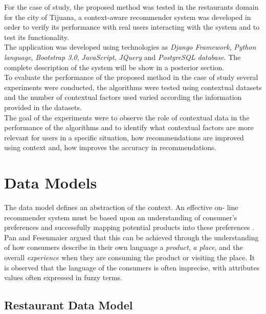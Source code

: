 For the case of study, the proposed method was tested in the 
restaurants domain for the city of Tijuana, a context-aware 
recommender system  was developed  in order to verify its 
performance with real users interacting with  the system and to
test  its functionality. \\  The application was developed using
technologies as \textit{Django Framework}, \textit{Python language}, 
\textit{Bootstrap 3.0}, \textit{JavaScript}, \textit{JQuery} and  
\textit{PostgreSQL database}. The complete description of the 
system will be show in a posterior section.\\ 
To evaluate the performance of the proposed method in
the case of study several experiments were conducted, the algorithms
were tested using  contextual datasets and the number of contextual
factors used varied  according the information provided in the
datasets. \\ The goal of the  experiments were to observe the role of
contextual data  in the performance of the algorithms and to
identify what contextual factors are more relevant for users in a
specific situation, how recommendations are improved using context
and, how improves the accuracy in recommendations.

\section{Data Models}

The data model defines an abstraction of the context. An effective on-
line  recommender system must be based upon an understanding of
consumer's  preferences and successfully mapping potential products
into these preferences  \cite{adomavicius2011context}. \\ Pan and
Fesenmaier  \cite{pan2006online} argued that this can be achieved
through the understanding of  how consumers describe in their own
language a \textit{product}, \textit{a place}, and the overall
\textit{experience}  when they are consuming the product or visiting
the place.  It is observed that  the language of the consumers is
often imprecise,  with attributes values often expressed in fuzzy
terms. 

\subsection{Restaurant Data Model}

